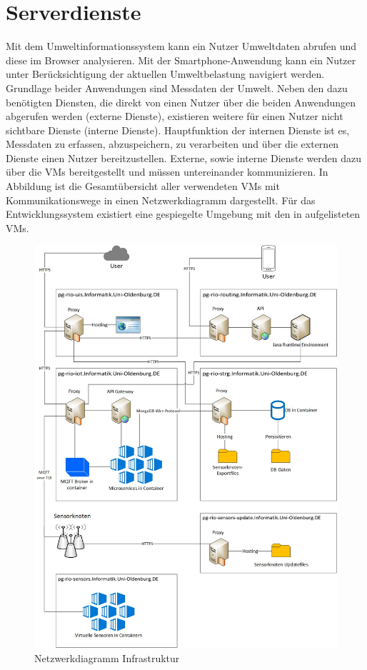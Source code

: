 \section{Serverdienste}
\label{sec:dienste}
Mit dem Umweltinformationssystem kann ein Nutzer Umweltdaten abrufen und diese im Browser analysieren.
Mit der Smartphone-Anwendung kann ein Nutzer unter Berücksichtigung der aktuellen Umweltbelastung navigiert werden.
Grundlage beider Anwendungen sind Messdaten der Umwelt.
Neben den dazu benötigten Diensten, die direkt von einen Nutzer über die beiden Anwendungen abgerufen werden (externe Dienste), existieren weitere für einen Nutzer nicht sichtbare Dienste (interne Dienste).
Hauptfunktion der internen Dienste ist es, Messdaten zu erfassen, abzuspeichern, zu verarbeiten und über die externen Dienste einen Nutzer bereitzustellen.
Externe, sowie interne Dienste werden dazu über die VMs bereitgestellt und müssen untereinander kommunizieren.
In Abbildung  ist die Gesamtübersicht aller verwendeten VMs mit Kommunikationswege in einen Netzwerkdiagramm dargestellt.
Für das Entwicklungssystem existiert eine gespiegelte Umgebung mit den in  aufgelisteten VMs.\newpage    

\begin{figure}[H]
	\centering
	\includegraphics[scale=0.5]{ressourcen/Infrastruktur}
	\caption{Netzwerkdiagramm Infrastruktur}
	\label{fig:infrastruktur}
\end{figure}
\newpage

